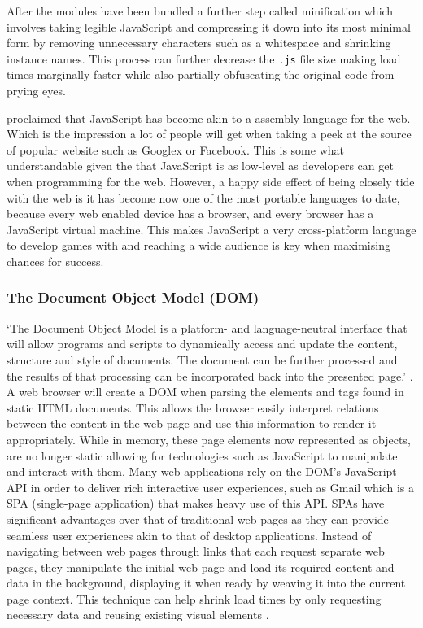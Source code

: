 \documentclass[final]{cmpreport}
\begin{document}
After the modules have been bundled a further step called minification which involves taking legible JavaScript and compressing it down into its most minimal form by removing unnecessary characters such as a whitespace and shrinking instance names. This process can further decrease the \texttt{.js} file size making load times marginally faster while also partially obfuscating the original code from prying eyes.

\cite{Hanselman} proclaimed that JavaScript has become akin to a assembly language for the web. Which is the impression a lot of people will get when taking a peek at the source of popular website such as Googlex or Facebook. This is some what understandable given the that JavaScript is as low-level as developers can get when programming for the web. However, a happy side effect of being closely tide with the web is it has become now one of the most portable languages to date, because every web enabled device has a browser, and every browser has a JavaScript virtual machine. This makes JavaScript a very cross-platform language to develop games with and reaching a wide audience is key when maximising chances for success.

\subsubsection{The Document Object Model (DOM)}
`The Document Object Model is a platform- and language-neutral interface that will allow programs and scripts to dynamically access and update the content, structure and style of documents. The document can be further processed and the results of that processing can be incorporated back into the presented page.' \citep{W3C3}. A web browser will create a DOM when parsing the elements and tags found in static HTML documents. This allows the browser easily interpret relations between the content in the web page and use this information to render it appropriately. While in memory, these page elements now represented as objects, are no longer static allowing for technologies such as JavaScript to manipulate and interact with them. Many web applications rely on the DOM's JavaScript API in order to deliver rich interactive user experiences, such as Gmail which is a SPA (single-page application) that makes heavy use of this API. SPAs have significant advantages over that of traditional web pages as they can provide seamless user experiences akin to that of desktop applications. Instead of navigating between web pages through links that each request separate web pages, they manipulate the initial web page and load its required content and data in the background, displaying it when ready by weaving it into the current page context. This technique can help shrink load times by only requesting necessary data and reusing existing visual elements \citep{Takada}.
\end{document}
